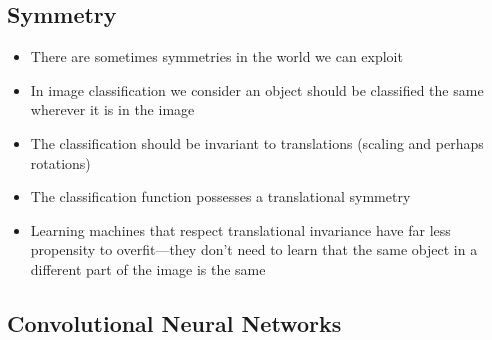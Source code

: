 \Outline %

\begin{slide}
\section{Symmetry}
  
\begin{PauseHighLight}
  \begin{itemize}
  \item There are sometimes symmetries in the world we can
    exploit\pause
  \item In image classification we consider an object should be
    classified the same wherever it is in the image\pause
  \item The classification should be invariant to translations
    (scaling and perhaps rotations)\pause
  \item The classification function possesses a translational
    symmetry\pause
  \item Learning machines that respect translational invariance have
    far less propensity to overfit\pause---they don't need to learn
    that the same object in a different part of the image is the same\pauseb
  \end{itemize}
\end{PauseHighLight}

\end{slide}


\begin{slide}
  \section{Convolutional Neural Networks}

  \pb
\pause {}
\begin{center}
  \pause
\end{center}
\end{slide}


